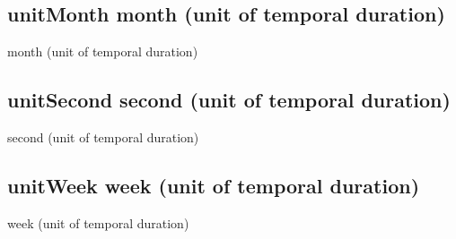 \documentclass[letterpaper,10pt,english]{sphinxmanual}
\begin{document}
\subsection{unitMonth \sphinxhyphen{} month (unit of temporal duration)}
\label{\detokenize{doc-unitMonth:unitmonth-month-unit-of-temporal-duration}}\label{\detokenize{doc-unitMonth:index-0}}\label{\detokenize{doc-unitMonth::doc}}
\begin{sphinxShadowBox}

\sphinxAtStartPar
month (unit of temporal duration)
\end{sphinxShadowBox}
\begin{quote}

\ignorespaces \end{quote}


\subsection{unitSecond \sphinxhyphen{} second (unit of temporal duration)}
\label{\detokenize{doc-unitSecond:unitsecond-second-unit-of-temporal-duration}}\label{\detokenize{doc-unitSecond:index-0}}\label{\detokenize{doc-unitSecond::doc}}
\begin{sphinxShadowBox}

\sphinxAtStartPar
second (unit of temporal duration)
\end{sphinxShadowBox}
\begin{quote}

\ignorespaces \end{quote}


\subsection{unitWeek \sphinxhyphen{} week (unit of temporal duration)}
\label{\detokenize{doc-unitWeek:unitweek-week-unit-of-temporal-duration}}\label{\detokenize{doc-unitWeek:index-0}}\label{\detokenize{doc-unitWeek::doc}}
\begin{sphinxShadowBox}

\sphinxAtStartPar
week (unit of temporal duration)
\end{sphinxShadowBox}
\begin{quote}

\ignorespaces \end{quote}
\end{document}

